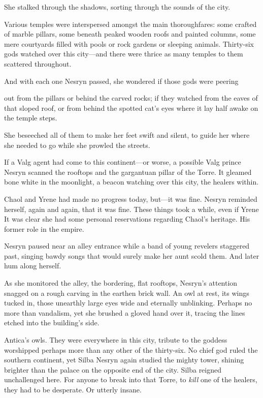She stalked through the shadows, sorting through the sounds of the city.

Various temples were interspersed amongst the main thoroughfares: some crafted of marble pillars, some beneath peaked wooden roofs and painted columns, some mere courtyards filled with pools or rock gardens or sleeping animals. Thirty-six gods watched over this city---and there were thrice as many temples to them scattered throughout.

And with each one Nesryn passed, she wondered if those gods were peering

out from the pillars or behind the carved rocks; if they watched from the eaves of that sloped roof, or from behind the spotted cat's eyes where it lay half awake on the temple steps.

She beseeched all of them to make her feet swift and silent, to guide her where she needed to go while she prowled the streets.

If a Valg agent had come to this continent---or worse, a possible Valg prince  Nesryn scanned the rooftops and the gargantuan pillar of the Torre. It gleamed bone white in the moonlight, a beacon watching over this city, the healers within.

Chaol and Yrene had made no progress today, but---it was fine. Nesryn reminded herself, again and again, that it was fine. These things took a while, even if Yrene  It was clear she had some personal reservations regarding Chaol's heritage. His former role in the empire.

Nesryn paused near an alley entrance while a band of young revelers staggered past, singing bawdy songs that would surely make her aunt scold them. And later hum along herself.

As she monitored the alley, the bordering, flat rooftops, Nesryn's attention snagged on a rough carving in the earthen brick wall. An owl at rest, its wings tucked in, those unearthly large eyes wide and eternally unblinking. Perhaps no more than vandalism, yet she brushed a gloved hand over it, tracing the lines etched into the building's side.

Antica's owls. They were everywhere in this city, tribute to the goddess worshipped perhaps more than any other of the thirty-six. No chief god ruled the southern continent, yet Silba  Nesryn again studied the mighty tower, shining brighter than the palace on the opposite end of the city. Silba reigned unchallenged here. For anyone to break into that Torre, to \emph{kill} one of the healers, they had to be desperate. Or utterly insane.

